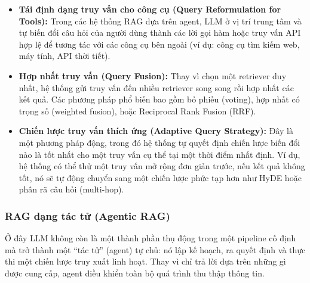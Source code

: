 \begin{itemize}
\begin{itemize}
		\item \textbf{Tái định dạng truy vấn cho công cụ (Query Reformulation for Tools):}
		Trong các hệ thống RAG dựa trên agent, LLM ở vị trí trung tâm và tự biến đổi câu hỏi của người dùng thành các lời gọi hàm hoặc truy vấn API hợp lệ để tương tác với các công cụ bên ngoài (ví dụ: công cụ tìm kiếm web, máy tính, API thời tiết).

		\item \textbf{Hợp nhất truy vấn (Query Fusion):}
		Thay vì chọn một retriever duy nhất, hệ thống gửi truy vấn đến nhiều retriever song song rồi hợp nhất các kết quả. Các phương pháp phổ biến bao gồm bỏ phiếu (voting), hợp nhất có trọng số (weighted fusion), hoặc Reciprocal Rank Fusion (RRF).

		\item \textbf{Chiến lược truy vấn thích ứng (Adaptive Query Strategy):}
		Đây là một phương pháp động, trong đó hệ thống tự quyết định chiến lược biến đổi nào là tốt nhất cho một truy vấn cụ thể tại một thời điểm nhất định. Ví dụ, hệ thống có thể thử một truy vấn mở rộng đơn giản trước, nếu kết quả không tốt, nó sẽ tự động chuyển sang một chiến lược phức tạp hơn như HyDE hoặc phân rã câu hỏi (multi-hop).
	\end{itemize}
\end{itemize}

\subsubsection{RAG dạng tác tử (Agentic RAG)}
\label{sssec:agentic_rag}
Ở đây LLM không còn là một thành phần thụ động trong một pipeline cố định mà trở thành một “tác tử” (agent) tự chủ: nó lập kế hoạch, ra quyết định và thực thi một chiến lược truy xuất linh hoạt. Thay vì chỉ trả lời dựa trên những gì được cung cấp, agent điều khiển toàn bộ quá trình thu thập thông tin.

